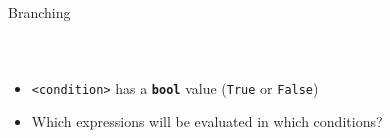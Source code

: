         \begin{frame}{Branching}
            \vspace{-3mm}
            \begin{columns}
                \inputminted[firstline=1, lastline=4, frame=single,framesep=2pt]{python3}{../Lecture2/code-examples/branching.py}
                \inputminted[firstline=6, lastline=13, frame=single,framesep=2pt]{python3}{../Lecture2/code-examples/branching.py}
                \inputminted[firstline=15, lastline=27, frame=single,framesep=2pt]{python3}{../Lecture2/code-examples/branching.py}
            \end{columns}
            \begin{itemize}
                \item \texttt{<condition>} has a \textbf{\texttt{bool}} value (\texttt{True} or \texttt{False})
                \item Which expressions will be evaluated in which conditions?
            \end{itemize}
        \end{frame}

